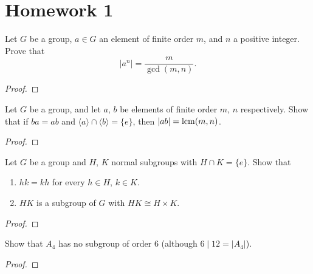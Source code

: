 \chapter{Homework 1}
\begin{problem}
Let $G$ be a group, $a\in G$ an element of finite order $m$, and $n$ a
positive integer. Prove that
\[
|a^n|=\frac{m}{\gcd(m,n)}.
\]
\end{problem}
\begin{proof}

\end{proof}

\begin{problem}
Let $G$ be a group, and let $a$, $b$ be elements of finite order $m$, $n$
respectively. Show that if $ba=ab$ and $\langle a\rangle\cap\langle
b\rangle=\{e\}$, then $|ab|=\operatorname{lcm}(m,n)$.
\end{problem}
\begin{proof}
\end{proof}

\begin{problem}
Let $G$ be a group and $H$, $K$ normal subgroups with $H\cap K=\{e\}$. Show
that
\begin{enumerate}[label=(\alph*)]
\item $hk=kh$ for every $h\in H$, $k\in K$.
\item $HK$ is a subgroup of $G$ with $HK\cong H\times K$.
\end{enumerate}
\end{problem}
\begin{proof}
\end{proof}

\begin{problem}
Show that $A_4$ has no subgroup of order $6$ (although $6\mid 12=|A_4|$).
\end{problem}
\begin{proof}
\end{proof}

